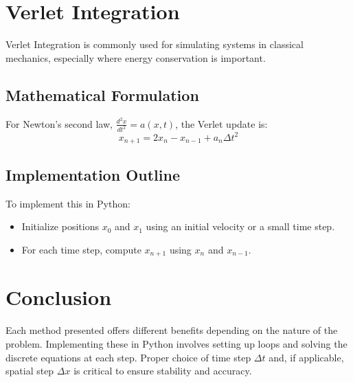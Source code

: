 \documentclass{article}
\begin{document}
\section{Verlet Integration}
Verlet Integration is commonly used for simulating systems in classical mechanics, especially where energy conservation is important.

\subsection{Mathematical Formulation}
For Newton's second law, $\frac{d^2 x}{dt^2} = a(x, t)$, the Verlet update is:
\[
x_{n+1} = 2 x_n - x_{n-1} + a_n \Delta t^2
\]

\subsection{Implementation Outline}
To implement this in Python:
\begin{itemize}
    \item Initialize positions $x_0$ and $x_1$ using an initial velocity or a small time step.
    \item For each time step, compute $x_{n+1}$ using $x_n$ and $x_{n-1}$.
\end{itemize}

\section{Conclusion}
Each method presented offers different benefits depending on the nature of the problem. Implementing these in Python involves setting up loops and solving the discrete equations at each step. Proper choice of time step $\Delta t$ and, if applicable, spatial step $\Delta x$ is critical to ensure stability and accuracy.
\end{document}
